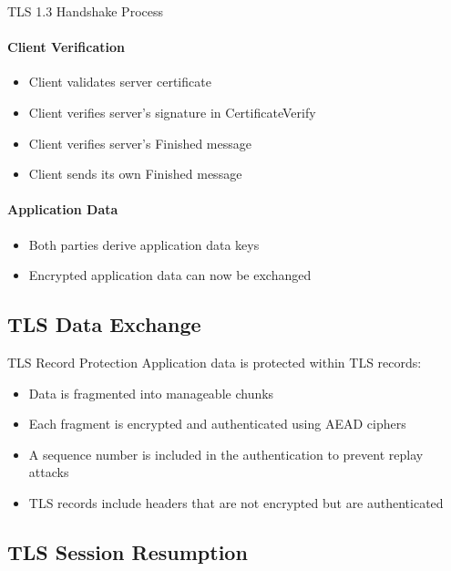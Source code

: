 \begin{KR}{TLS 1.3 Handshake Process}
\paragraph{Client Verification}
\begin{itemize}
    \item Client validates server certificate
    \item Client verifies server's signature in CertificateVerify
    \item Client verifies server's Finished message
    \item Client sends its own Finished message
\end{itemize}

\paragraph{Application Data}
\begin{itemize}
    \item Both parties derive application data keys
    \item Encrypted application data can now be exchanged
\end{itemize}
\end{KR}

\subsection{TLS Data Exchange}

\begin{concept}{TLS Record Protection}
Application data is protected within TLS records:
\begin{itemize}
    \item Data is fragmented into manageable chunks
    \item Each fragment is encrypted and authenticated using AEAD ciphers
    \item A sequence number is included in the authentication to prevent replay attacks
    \item TLS records include headers that are not encrypted but are authenticated
\end{itemize}
\end{concept}

\subsection{TLS Session Resumption}

